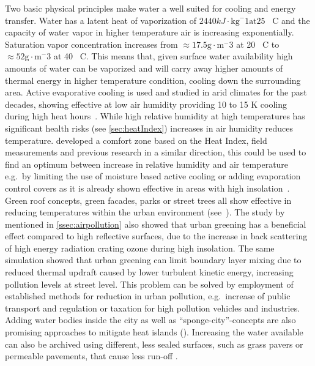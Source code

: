 \documentclass[12pt,a4paper, english,twoside]{scrartcl}
\begin{document}
      Two basic physical principles make water a well suited for cooling and energy transfer.
      Water has a latent heat of vaporization of $2440 kJ\cdot \text{kg}^-1 \text{at} 25$ \textdegree\ C and the capacity of water vapor in higher temperature air is increasing exponentially.
      Saturation vapor concentration increases from $\approx17.5 \text{g}\cdot \text{m}^-3$ at 20 \textdegree\ C  to $\approx 52 \text{g}\cdot \text{m}^-3$ at 40 \textdegree\ C.
      This means that, given surface water availability high amounts of water can be vaporized and will carry away higher amounts of thermal energy in higher temperature condition, cooling down the surrounding area. 
      Active evaporative cooling is used and studied in arid climates for the past decades, showing effective at low air humidity providing 10 to 15 K cooling during high heat hours~\autocite{Vanos2022}.
      While high relative humidity at high temperatures has significant health risks (see \cref{sec:heatIndex}) increases in air humidity reduces temperature.
      \Cite{Pontes2022} developed a comfort zone based on the Heat Index, field measurements and previous research in a similar direction, this could be used to find an optimum between increase in relative humidity and air temperature e.g.\ by limiting the use of moisture based active cooling or adding evaporation control covers as it is already shown effective in areas with high insolation~\cite{Ghazvinian2021}.\\
      Green roof concepts, green facades, parks or street trees all show effective in reducing temperatures within the urban environment (see~\cite{Ramamurthy2014, Feyisa2014, Dimoudi2003, Gartland2008}).
      The study by~\cite{Fallmann2016} mentioned in \cref{ssec:airpollution} also showed that urban greening has a beneficial effect compared to high reflective surfaces, due to the increase in back scattering of high energy radiation crating ozone during high insolation.
      The same simulation showed that urban greening can limit boundary layer mixing due to reduced thermal updraft caused by lower turbulent kinetic energy, increasing pollution levels at street level.
      This problem can be solved by employment of established methods for reduction in urban pollution, e.g.\ increase of public transport and regulation or taxation for high pollution vehicles and industries. \\
      Adding water bodies inside the city as well as ``sponge-city''-concepts are also promising approaches to mitigate heat islands (\cite{He2019}).
      Increasing the water available can also be archived using different, less sealed surfaces, such as grass pavers or permeable pavements, that cause less run-off \autocite[p. 7]{EPA2008}.
\end{document}
